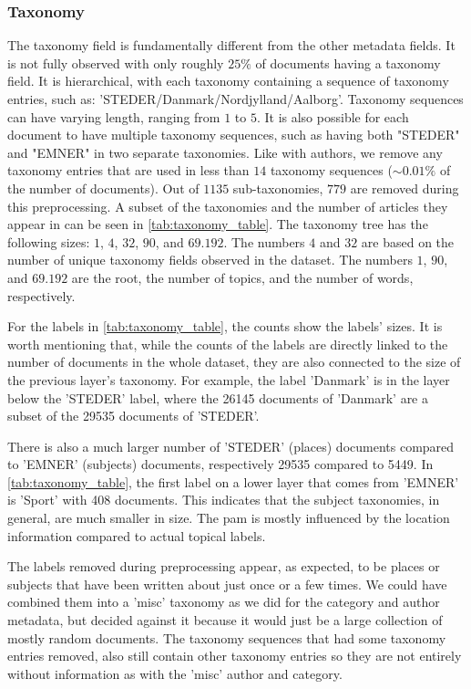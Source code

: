 \subsubsection{Taxonomy}\label{subsec:appendix_taxonomy}
The taxonomy field is fundamentally different from the other metadata fields.
It is not fully observed with only roughly $25\%$ of documents having a taxonomy field.
It is hierarchical, with each taxonomy containing a sequence of taxonomy entries, such as: 'STEDER/Danmark/Nordjylland/Aalborg'.
Taxonomy sequences can have varying length, ranging from $1$ to $5$.
It is also possible for each document to have multiple taxonomy sequences, such as having both "STEDER" and "EMNER" in two separate taxonomies.
Like with authors, we remove any taxonomy entries that are used in less than $14$ taxonomy sequences (${\sim}0.01\%$ of the number of documents).
Out of $1135$ sub-taxonomies, $779$ are removed during this preprocessing.
A subset of the taxonomies and the number of articles they appear in can be seen in \autoref{tab:taxonomy_table}.
The taxonomy tree has the following sizes: $1$, $4$, $32$, $90$, and $69.192$.
The numbers $4$ and $32$ are based on the number of unique taxonomy fields observed in the dataset.
The numbers $1$, $90$, and $69.192$ are the root, the number of topics, and the number of words, respectively.

For the labels in \autoref{tab:taxonomy_table}, the counts show the labels' sizes.
It is worth mentioning that, while the counts of the labels are directly linked to the number of documents in the whole dataset, they are also connected to the size of the previous layer's taxonomy.
For example, the label 'Danmark' is in the layer below the 'STEDER' label, where the 26145 documents of 'Danmark' are a subset of the 29535 documents of 'STEDER'.

There is also a much larger number of 'STEDER' (places) documents compared to 'EMNER' (subjects) documents, respectively 29535 compared to 5449.
In \autoref{tab:taxonomy_table}, the first label on a lower layer that comes from 'EMNER' is 'Sport' with 408 documents.
This indicates that the subject taxonomies, in general, are much smaller in size.
The \gls{pam} is mostly influenced by the location information compared to actual topical labels.

The labels removed during preprocessing appear, as expected, to be places or subjects that have been written about just once or a few times.
We could have combined them into a 'misc' taxonomy as we did for the category and author metadata, but decided against it because it would just be a large collection of mostly random documents.
The taxonomy sequences that had some taxonomy entries removed, also still contain other taxonomy entries so they are not entirely without information as with the 'misc' author and category.

